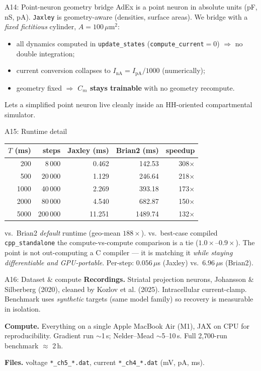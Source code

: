 \documentclass[17pt, t, lualatex]{beamer}
\begin{document}
\begin{frame}{A14: Point-neuron geometry bridge}
\small
AdEx is a point neuron in absolute units (pF, nS, pA). \texttt{Jaxley} is geometry-aware (densities, surface areas). We bridge with a \emph{fixed fictitious} cylinder, $A = 100\,\mu\text{m}^2$:
\begin{itemize}
  \item all dynamics computed in \texttt{update\_states} (\texttt{compute\_current}$=0$) $\Rightarrow$ no double integration;
  \item current conversion collapses to $I_{\text{nA}} = I_{\text{pA}}/1000$ (numerically);
  \item geometry fixed $\Rightarrow$ \textbf{$C_m$ stays trainable} with no geometry recompute.
\end{itemize}
\vspace{0.15cm}
\footnotesize Lets a simplified point neuron live cleanly inside an HH-oriented compartmental simulator.
\end{frame}

\begin{frame}{A15: Runtime detail}
\centering\small
\begin{tabular}{rrrrr}
\toprule
$T$ (ms) & steps & Jaxley (ms) & Brian2 (ms) & speedup \\
\midrule
200  & 8\,000   & 0.462  & 142.53  & 308$\times$ \\
500  & 20\,000  & 1.129  & 246.64  & 218$\times$ \\
1000 & 40\,000  & 2.269  & 393.18  & 173$\times$ \\
2000 & 80\,000  & 4.540  & 682.87  & 150$\times$ \\
5000 & 200\,000 & 11.251 & 1489.74 & 132$\times$ \\
\bottomrule
\end{tabular}
\vspace{0.25cm}

\footnotesize vs.\ Brian2 \emph{default} runtime (geo-mean $188\times$). vs.\ best-case compiled \texttt{cpp\_standalone} the compute-vs-compute comparison is a tie ($1.0\times$--$0.9\times$). The point is not out-computing a C compiler --- it is matching it \emph{while staying differentiable and GPU-portable}. Per-step: $0.056\,\mu$s (Jaxley) vs.\ $6.96\,\mu$s (Brian2).
\end{frame}

\begin{frame}{A16: Dataset \& compute}
\small
\textbf{Recordings.} Striatal projection neurons, Johansson \& Silberberg (2020), cleaned by Kozlov et al. (2025). Intracellular current-clamp. Benchmark uses \emph{synthetic} targets (same model family) so recovery is measurable in isolation.
\vspace{0.2cm}

\textbf{Compute.} Everything on a single Apple MacBook Air (M1), JAX on CPU for reproducibility. Gradient run $\sim$1\,s; Nelder--Mead $\sim$5--10\,s. Full 2{,}700-run benchmark $\approx$ 2\,h.
\vspace{0.2cm}

\textbf{Files.} voltage \texttt{*\_ch5\_*.dat}, current \texttt{*\_ch4\_*.dat} (mV, pA, ms).
\end{frame}

\insertendpage
\end{document}
